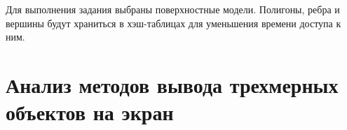 Для выполнения задания выбраны поверхностные модели. Полигоны, ребра и вершины будут храниться в хэш-таблицах для уменьшения времени доступа к ним.

\section{Анализ методов вывода трехмерных объектов на экран}

